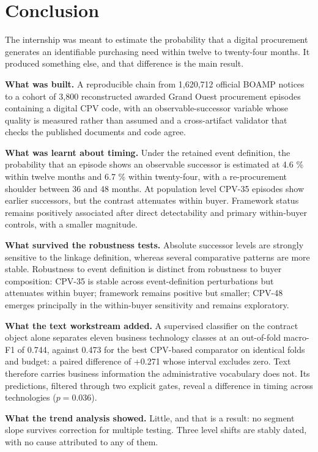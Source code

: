 \section{Conclusion}

The internship was meant to estimate the probability that a digital procurement generates an identifiable purchasing need within twelve to twenty-four months. It produced something else, and that difference is the main result.

\textbf{What was built.} A reproducible chain from 1,620,712 official BOAMP notices to a cohort of 3,800 reconstructed awarded Grand Ouest procurement episodes containing a digital CPV code, with an observable-successor variable whose quality is measured rather than assumed and a cross-artifact validator that checks the published documents and code agree.

\textbf{What was learnt about timing.} Under the retained event definition, the probability that an episode shows an observable successor is estimated at 4.6 \% within twelve months and 6.7 \% within twenty-four, with a re-procurement shoulder between 36 and 48 months. At population level CPV-35 episodes show earlier successors, but the contrast attenuates within buyer. Framework status remains positively associated after direct detectability and primary within-buyer controls, with a smaller magnitude.

\textbf{What survived the robustness tests.} Absolute successor levels are strongly sensitive to the linkage definition, whereas several comparative patterns are more stable. Robustness to event definition is distinct from robustness to buyer composition: CPV-35 is stable across event-definition perturbations but attenuates within buyer; framework remains positive but smaller; CPV-48 emerges principally in the within-buyer sensitivity and remains exploratory.

\textbf{What the text workstream added.} A supervised classifier on the contract object alone separates eleven business technology classes at an out-of-fold macro-F1 of 0.744, against 0.473 for the best CPV-based comparator on identical folds and budget: a paired difference of +0.271 whose interval excludes zero. Text therefore carries business information the administrative vocabulary does not. Its predictions, filtered through two explicit gates, reveal a difference in timing across technologies (\(p = 0.036\)).

\textbf{What the trend analysis showed.} Little, and that is a result: no segment slope survives correction for multiple testing. Three level shifts are stably dated, with no cause attributed to any of them.

